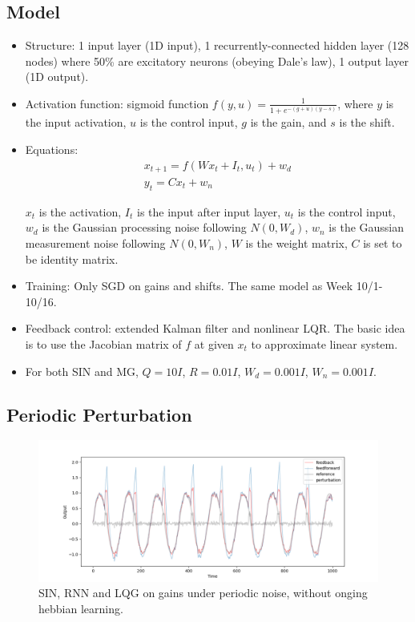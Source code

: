 \documentclass[12pt, a4paper]{article}
\begin{document}
\subsection*{Model}
\begin{itemize}
    \item Structure: 1 input layer (1D input), 1 recurrently-connected hidden layer (128 nodes) where 50\% are excitatory neurons (obeying Dale's law), 1 output layer (1D output).

    \item Activation function: sigmoid function $f(y, u) = \frac{1}{1 + e^{-(g + u)(y - s)}}$, where $y$ is the input activation, $u$ is the control input, $g$ is the gain, and $s$ is the shift. 
    
    \item Equations: 
    \begin{eqnarray}
    \nonumber
    x_{t+1} = f(Wx_t + I_{t}, u_{t}) + w_d \\
    \nonumber
    y_t = Cx_{t} + w_n
    \end{eqnarray}
    
    $x_t$ is the activation, $I_t$ is the input after input layer, $u_t$ is the control input, $w_d$ is the Gaussian processing noise following $N(0,W_d)$, $w_n$ is the Gaussian measurement noise following $N(0,W_n)$, $W$ is the weight matrix, $C$ is set to be identity matrix.

    \item Training: Only SGD on gains and shifts. The same model as Week 10/1-10/16.

    \item Feedback control: extended Kalman filter and nonlinear LQR. The basic idea is to use the Jacobian matrix of $f$ at given $x_t$ to approximate linear system.
    
    \item For both SIN and MG, $Q = 10I$, $R = 0.01I$, $W_d = 0.001I$, $W_n = 0.001I$.

\end{itemize}

\newpage

\subsection*{Periodic Perturbation}

\begin{figure}[H]
    \centering
    \includegraphics[width=\textwidth]{RNN/ourRNN/analysis/fig/1113_SIN_lqg.png}
    \caption{SIN, RNN and LQG on gains under periodic noise, without onging hebbian learning.}
\end{figure}
\end{document}

